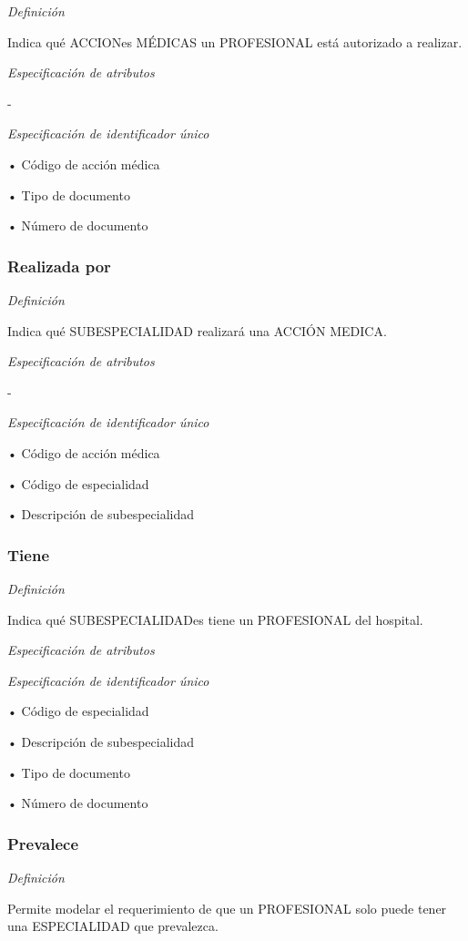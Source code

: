 \documentclass[a4paper,11pt]{article}
\begin{document}
\textit{Definición}

Indica qué ACCIONes MÉDICAS un PROFESIONAL está autorizado a realizar.

\textit{Especificación de atributos}

-

\textit{Especificación de identificador único}

• Código de acción médica

• Tipo de documento

• Número de documento\label{HToc293405825}

\subsubsection{\textbf{Realizada por}}

\textit{Definición}

Indica qué SUBESPECIALIDAD realizará una ACCIÓN MEDICA.

\textit{Especificación de atributos}

-

\textit{Especificación de identificador único}

• Código de acción médica

• Código de especialidad

• Descripción de subespecialidad\label{HToc293405826}

\subsubsection{\textbf{Tiene}}

\textit{Definición}

Indica qué SUBESPECIALIDADes tiene un PROFESIONAL del hospital.

\textit{Especificación de atributos}

\textit{Especificación de identificador único}

• Código de especialidad

• Descripción de subespecialidad

• Tipo de documento

• Número de documento\label{HToc293405827}

\subsubsection{\textbf{Prevalece}}

\textit{Definición}

Permite modelar el requerimiento de que un PROFESIONAL solo puede tener una ESPECIALIDAD 
que prevalezca.
\end{document}
